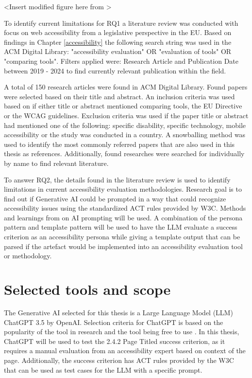 <Insert modified figure here from \textcite{iterativedesignscience}>

To identify current limitations for RQ1 a literature review was conducted with focus on web accessibility from a legislative perspective in the EU. Based on findings in Chapter \ref{accessibility} the following search string was used in the ACM Digital Library: "accessibility evaluation" OR "evaluation of tools" OR "comparing tools". Filters applied were: Research Article and Publication Date between 2019 - 2024 to find currently relevant publication within the field. 

A total of 150 research articles were found in ACM Digital Library. Found papers were selected based on their title and abstract. An inclusion criteria was used based on if either title or abstract mentioned comparing tools, the EU Directive or the WCAG guidelines. Exclusion criteria was used if the paper title or abstract had mentioned one of the following: specific disability, specific technology, mobile accessibility or the study was conducted in a country. A snowballing method was used to identify the most commonly referred papers that are also used in this thesis as references. Additionally, found researches were searched for individually by name to find relevant literature.

To answer RQ2, the details found in the literature review is used to identify limitations in current accessibility evaluation methodologies. Research goal is to find out if Generative AI could be prompted in a way that could recognize accessibility issues using the standardized ACT rules provided by W3C. Methods and learnings from \textcite{white2023prompt} on AI prompting will be used. A combination of the persona pattern and template pattern will be used to have the LLM evaluate a success criterion as an accessibility persona while giving a template output that can be parsed if the artefact would be implemented into an accessibility evaluation tool or methodology.

\section{Selected tools and scope}

The Generative AI selected for this thesis is a Large Language Model (LLM) ChatGPT 3.5 by OpenAI. Selection criteria for ChatGPT is based on the popularity of the tool in research and the tool being free to use \citep{ouyang2023llm, white2023prompt}. In this thesis, ChatGPT will be used to test the 2.4.2 Page Titled success criterion, as it requires a manual evaluation from an accessibility expert based on context of the page. Additionally, the success criterion has ACT rules provided by the W3C that can be used as test cases for the LLM with a specific prompt. 

